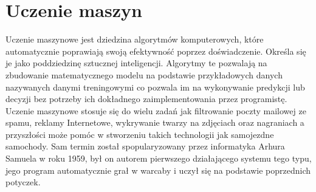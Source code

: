 \chapter{Uczenie maszyn}
Uczenie maszynowe jest dziedzina algorytmów komputerowych, które automatycznie poprawiają swoją efektywność poprzez doświadczenie. 
Określa się je jako poddziedzinę sztucznej inteligencji. Algorytmy te pozwalają na zbudowanie matematycznego modelu na podstawie 
przykładowych danych nazywanych danymi treningowymi co pozwala im na wykonywanie predykcji lub decyzji bez potrzeby ich dokładnego 
zaimplementowania przez programistę. Uczenie maszynowe stosuje się do wielu zadań jak filtrowanie poczty mailowej ze spamu, reklamy Internetowe, 
wykrywanie twarzy na zdjęciach oraz nagraniach a przyszłości może pomóc w stworzeniu takich technologii jak 
samojezdne samochody. Sam termin został spopularyzowany przez informatyka Arhura Samuela w roku 1959, był on autorem pierwszego działającego 
systemu tego typu, jego program automatycznie grał w warcaby i uczył się na podstawie poprzednich potyczek.
